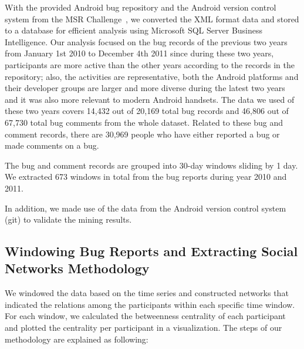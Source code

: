 \documentclass[conference]{IEEEtran}
\begin{document}
With the provided Android bug repository and the Android version
control system
from the MSR Challenge~\cite{DATA:msr}, we converted the XML format data and stored to
a database for efficient analysis using Microsoft SQL Server Business
Intelligence. Our analysis focused on the bug records of the previous
two years from January 1st 2010 to December 4th 2011 since during these two years, participants
are more active than the other years according to the records in the repository; also, the
activities are representative, both the Android platforms and their developer groups are larger and more diverse during the latest two years and it was also more relevant to modern Android handsets. The data we used of these two years 
covers 14,432 out of 20,169 total bug records and 46,806 out of 67,730
total bug comments from the whole dataset. Related to these bug and comment records, there
are 30,969 people who have either reported a bug or made comments on a
bug.


The bug and comment records are grouped into 30-day windows sliding by
1 day. 
We extracted 673 windows in total from the bug reports during year 2010 and 2011.

In addition, we made use of the data from the Android version control
system (git)
to validate the mining results.



\subsection{Windowing Bug Reports and Extracting Social Networks Methodology}
We windowed the data based on the time series and constructed networks
that indicated the relations among the participants within each specific
time window. For each window, we calculated the betweenness centrality of each
participant and plotted the centrality per participant in a visualization. The steps of our methodology are
explained as following:
\end{document}
